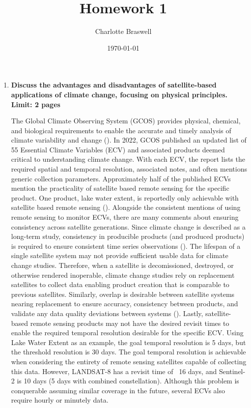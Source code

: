 \documentclass[12pt, letterpaper]{article}
\title{Homework 1}
\author{Charlotte Braswell}
\date{\today}
\begin{document}
\maketitle
\pagebreak
\begin{enumerate}
    \item \textbf{Discuss the advantages and disadvantages of satellite-based applications of climate change, focusing on physical principles. Limit: 2 pages}
    
    \bigskip
    The Global Climate Observing System (GCOS) provides physical, chemical, and biological requirements to enable the accurate and timely analysis of climate variability and change (\cite{karl_observation_2010}). In 2022, GCOS published an updated list of 55 Essential Climate Variables (ECV) and associated products deemed critical to understanding climate change. With each ECV, the report lists the required spatial and temporal resolution, associated notes, and often mentions generic collection parameters. Approximately half of the published ECVs mention the practicality of satellite based remote sensing for the specific product. One product, lake water extent, is reportedly only achievable with satellite based remote sensing (\cite{2022ecvs}). Alongside the consistent mentions of using remote sensing to monitor ECVs, there are many comments about ensuring consistency across satellite generations. Since climate change is described as a long-term study, consistency in producible products (and produced products) is required to ensure consistent time series observations (\cite{karl_observation_2010}). The lifespan of a single satellite system may not provide sufficient usable data for climate change studies. Therefore, when a satellite is decomissioned, destroyed, or otherwise rendered inoperable, climate change studies rely on replacement satellites to collect data enabling product creation that is comparable to previous satellites. Similarly, overlap is desirable between satellite systems nearing replacement to ensure accuracy, consistency between products, and validate any data quality deviations between systems (\cite{karl_observation_2010}). Lastly, satellite-based remote sensing products may not have the desired revisit times to enable the required temporal resolution desirable for the specific ECV. Using Lake Water Extent as an example, the goal temporal resolution is 5 days, but the threshold resolution is 30 days. The goal temporal resolution is achievable when considering the entirety of remote sensing satellites capable of collecting this data. However, LANDSAT-8 has a revisit time of ~16 days, and Sentinel-2 is 10 days (5 days with combined constellation). Although this problem is conquerable assuming similar coverage in the future, several ECVs also require hourly or minutely data. 


\end{enumerate}
\end{document}
